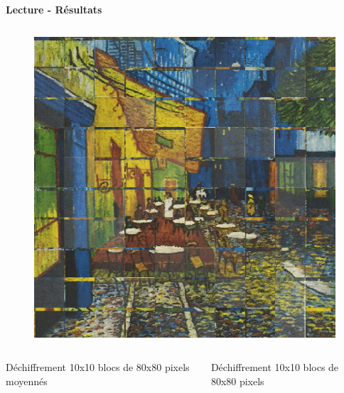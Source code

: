 \documentclass{beamer}
\begin{document}
\begin{frame}[t]
\begin{columns}[t]
\begin{column}{.49\linewidth}
\begin{block}{\centering \textbf{Lecture - Résultats}}
\begin{columns}[t]
                        \begin{column}{.2\linewidth}
                            \begin{figure}[t]
                                \hspace{.5cm}
                                \includegraphics[width=\linewidth]{rsc/van_gogh_picture_10_d.png}\\
                            \end{figure}
                        \end{column}
                    \end{columns}

                    \begin{columns}[t]
                        \begin{column}{.5\linewidth}
                            \begin{center}
                                {\small Déchiffrement 10x10 blocs de 80x80 pixels moyennés}
                            \end{center}
                        \end{column}

                        \begin{column}{.5\linewidth}
                            \begin{center}
                                {\small Déchiffrement 10x10 blocs de 80x80 pixels}
                            \end{center}
                        \end{column}
                    \end{columns}


\end{block}
\end{column}
\end{columns}
\end{frame}
\end{document}
